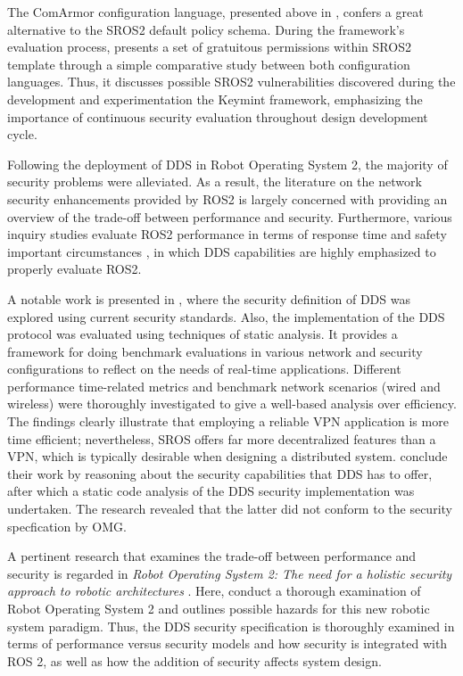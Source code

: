 The ComArmor configuration language, presented above in , confers a great alternative to the SROS2 default policy schema. During the framework's evaluation process, \citeauthor{white2018procedurally} presents a set of gratuitous permissions within SROS2 template through a simple comparative study between both configuration languages. Thus, it discusses possible SROS2 vulnerabilities discovered during the development and experimentation the Keymint framework, emphasizing the importance of continuous security evaluation throughout design development cycle.

Following the deployment of DDS in Robot Operating System 2, the majority of security problems were alleviated. As a result, the literature on the network security enhancements provided by ROS2 is largely concerned with providing an overview of the trade-off between performance and security. Furthermore, various inquiry studies evaluate ROS2 performance in terms of response time and safety important circumstances \cite{maruyama2016exploring, casini2019response}, in which DDS capabilities are highly emphasized to properly evaluate ROS2.

A notable work is presented in , where the security definition of DDS was explored using current security standards. Also, the implementation of the DDS protocol was evaluated using techniques of static analysis. It provides a framework for doing benchmark evaluations in various network and security configurations to reflect on the needs of real-time applications. Different performance time-related metrics and benchmark network scenarios (wired and wireless) were thoroughly investigated to give a well-based analysis over efficiency. The findings clearly illustrate that employing a reliable VPN application is more time efficient; nevertheless, SROS offers far more decentralized features than a VPN, which is typically desirable when designing a distributed system. \citeauthor*{kim2018security} conclude their work by reasoning about the security capabilities that DDS has to offer, after which a static code analysis of the DDS security implementation was undertaken. The research revealed that the latter did not conform to the security specfication by OMG. 

A pertinent research that examines the trade-off between performance and security is regarded in \textit{Robot Operating System 2: The need for a holistic security approach to robotic architectures} \cite{diluoffo2018robot}. Here, \citeauthor{diluoffo2018robot} conduct a thorough examination of Robot Operating System 2 and outlines possible hazards for this new robotic system paradigm. Thus, the DDS security specification is thoroughly examined in terms of performance versus security models and how security is integrated with ROS 2, as well as how the addition of security affects system design. 

